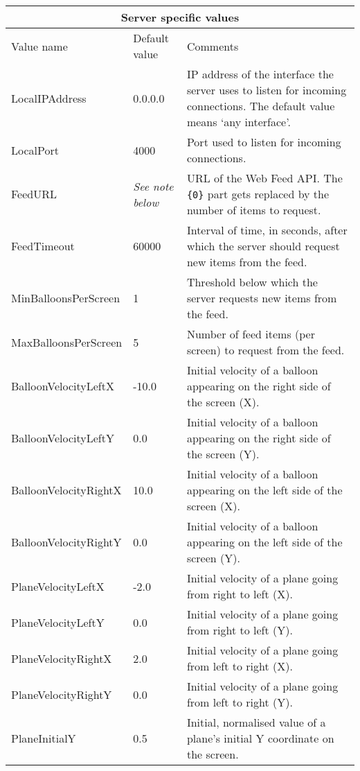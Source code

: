 \begin{tabular}{|p{5.0cm}|p{3.0cm}|p{7.6cm}|}

\hline \multicolumn{3}{|c|}{Server specific values} \\ \hline

Value name & Default value & Comments \\ \hline

LocalIPAddress & 0.0.0.0 & IP address of the interface the server uses to listen for incoming connections. The default value means `any interface'. \\ \hline

LocalPort & 4000 & Port used to listen for incoming connections. \\ \hline

FeedURL & \emph{See note below} & URL of the Web Feed API. The \verb${0}$ part gets replaced by the number of items to request. \\ \hline

FeedTimeout & 60000 & Interval of time, in seconds, after which the server should request new items from the feed. \\ \hline

MinBalloonsPerScreen & 1 & Threshold below which the server requests new items from the feed. \\ \hline

MaxBalloonsPerScreen & 5 & Number of feed items (per screen) to request from the feed. \\ \hline

BalloonVelocityLeftX & -10.0 & Initial velocity of a balloon appearing on the right side of the screen (X). \\ \hline

BalloonVelocityLeftY & 0.0 & Initial velocity of a balloon appearing on the right side of the screen (Y). \\ \hline

BalloonVelocityRightX & 10.0 & Initial velocity of a balloon appearing on the left side of the screen (X). \\ \hline

BalloonVelocityRightY & 0.0 & Initial velocity of a balloon appearing on the left side of the screen (Y). \\ \hline

PlaneVelocityLeftX & -2.0 & Initial velocity of a plane going from right to left (X). \\ \hline

PlaneVelocityLeftY & 0.0 & Initial velocity of a plane going from right to left (Y). \\ \hline

PlaneVelocityRightX & 2.0 & Initial velocity of a plane going from left to right (X). \\ \hline

PlaneVelocityRightY & 0.0 & Initial velocity of a plane going from left to right (Y). \\ \hline

PlaneInitialY & 0.5 & Initial, normalised value of a plane's initial Y coordinate on the screen. \\ \hline

\end{tabular}

